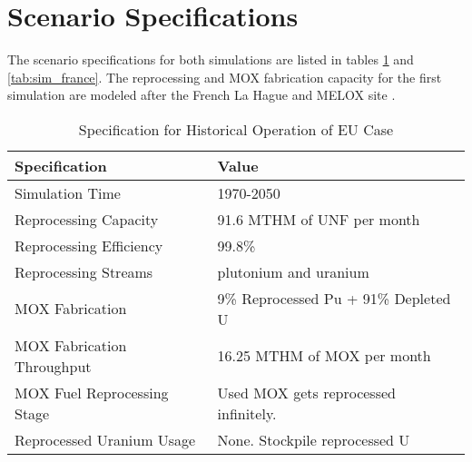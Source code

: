 \section{Scenario Specifications}

The scenario specifications for both simulations are
listed in tables \ref{tab:sim_eu} and \ref{tab:sim_france}.
The reprocessing and \gls{MOX} fabrication capacity for the 
first simulation are modeled after the 
French La Hague and MELOX site \cite{schneider_spent_2008, hugelmann_melox_1999}.

\begin{table}[h]
	\centering
	\begin{tabularx}{\textwidth}{bb}
		\hline
		\textbf{Specification} &\textbf{ Value} \\
		\hline
		Simulation Time & 1970-2050 \\ 
		Reprocessing Capacity & 91.6 MTHM of \gls{UNF} per month \cite{schneider_spent_2008} \\
		Reprocessing Efficiency & 99.8\% \\
		Reprocessing Streams & plutonium and uranium \\
		\gls{MOX} Fabrication & \small{9\% Reprocessed Pu + 91\% Depleted U} \\
		\gls{MOX} Fabrication Throughput & 16.25 MTHM of \gls{MOX} per month  \cite{hugelmann_melox_1999} \\
		\gls{MOX} Fuel Reprocessing Stage &  Used \gls{MOX} gets reprocessed infinitely. \\  
		Reprocessed Uranium Usage &  None. Stockpile reprocessed U \\
		\hline
	\end{tabularx}
	\caption {Specification for Historical Operation of \gls{EU} Case}
	\label{tab:sim_eu}
\end{table}


